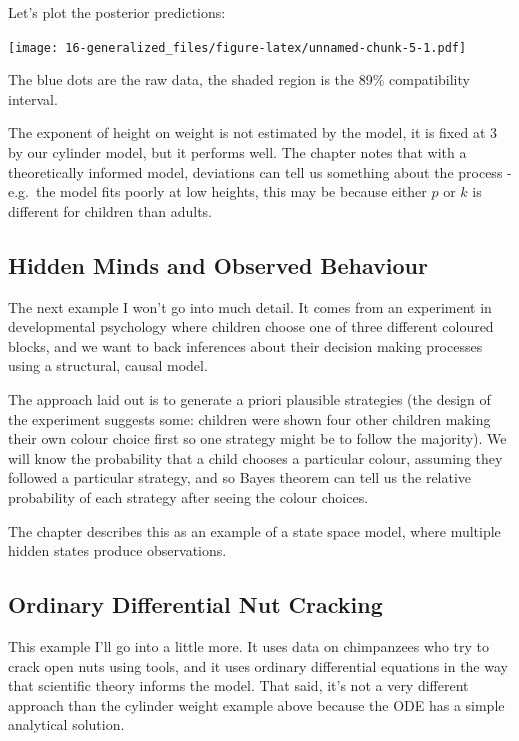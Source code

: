 \documentclass[
]{book}
\begin{document}
Let's plot the posterior predictions:

\texttt{[image: 16-generalized\_files/figure-latex/unnamed-chunk-5-1.pdf]}

The blue dots are the raw data, the shaded region is the 89\% compatibility interval.

The exponent of height on weight is not estimated by the model, it is fixed at 3 by our cylinder model, but it performs well. The chapter notes that with a theoretically informed model, deviations can tell us something about the process - e.g.~the model fits poorly at low heights, this may be because either \(p\) or \(k\) is different for children than adults.

\hypertarget{hidden-minds-and-observed-behaviour}{%
\subsection*{Hidden Minds and Observed Behaviour}\label{hidden-minds-and-observed-behaviour}}

The next example I won't go into much detail. It comes from an experiment in developmental psychology where children choose one of three different coloured blocks, and we want to back inferences about their decision making processes using a structural, causal model.

The approach laid out is to generate a priori plausible strategies (the design of the experiment suggests some: children were shown four other children making their own colour choice first so one strategy might be to follow the majority). We will know the probability that a child chooses a particular colour, assuming they followed a particular strategy, and so Bayes theorem can tell us the relative probability of each strategy after seeing the colour choices.

The chapter describes this as an example of a state space model, where multiple hidden states produce observations.

\hypertarget{ordinary-differential-nut-cracking}{%
\subsection*{Ordinary Differential Nut Cracking}\label{ordinary-differential-nut-cracking}}

This example I'll go into a little more. It uses data on chimpanzees who try to crack open nuts using tools, and it uses ordinary differential equations in the way that scientific theory informs the model. That said, it's not a very different approach than the cylinder weight example above because the ODE has a simple analytical solution.
\end{document}
